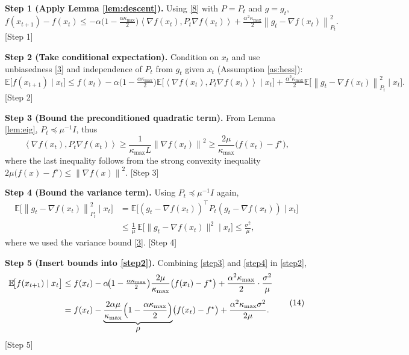 \documentclass{article}
\newcommand{\E}{\mathbb{E}}
\newcommand{\norm}[1]{\left\lVert#1\right\rVert}
\newcommand{\ip}[2]{\left\langle #1,#2\right\rangle}
\newcommand{\grad}{\nabla}
\begin{document}
\noindent\textbf{Step 1 (Apply Lemma \ref{lem:descent}).}  
Using \eqref{8} with $P=P_t$ and $g=g_t$,
\[
f(x_{t+1})-f(x_t)\le -\alpha\!\bigl(1-\tfrac{\alpha\kappa_{\max}}{2}\bigr)
\ip{\grad f(x_t)}{P_t\grad f(x_t)}
+\tfrac{\alpha^2\kappa_{\max}}{2}\norm{g_t-\grad f(x_t)}_{P_t}^2 .
\tag{10}\label{step1}
\]
[Step 1]

\noindent\textbf{Step 2 (Take conditional expectation).}  
Condition on $x_t$ and use unbiasedness \eqref{3} and independence of $P_t$ from $g_t$ given $x_t$ (Assumption \ref{as:hess}):
\[
\E\!\big[f(x_{t+1})\mid x_t\big]\le
f(x_t)-\alpha\!\bigl(1-\tfrac{\alpha\kappa_{\max}}{2}\bigr)
\E\!\big[\ip{\grad f(x_t)}{P_t\grad f(x_t)}\mid x_t\big]
+\tfrac{\alpha^2\kappa_{\max}}{2}
\E\!\big[\norm{g_t-\grad f(x_t)}_{P_t}^2\mid x_t\big].
\tag{11}\label{step2}
\]
[Step 2]

\noindent\textbf{Step 3 (Bound the preconditioned quadratic term).}  
From Lemma \ref{lem:eig}, $P_t\preceq \mu^{-1}I$, thus
\[
\ip{\grad f(x_t)}{P_t\grad f(x_t)}
\ge \frac{1}{\kappa_{\max}L}\norm{\grad f(x_t)}^2
\ge \frac{2\mu}{\kappa_{\max}}\bigl(f(x_t)-f^\star\bigr),
\tag{12}\label{step3}
\]
where the last inequality follows from the strong convexity inequality $2\mu\bigl(f(x)-f^\star\bigr)\le\norm{\grad f(x)}^2$.
[Step 3]

\noindent\textbf{Step 4 (Bound the variance term).}  
Using $P_t\preceq \mu^{-1}I$ again,
\[
\begin{aligned}
\E\!\big[\norm{g_t-\grad f(x_t)}_{P_t}^2\mid x_t\big]
&=\E\!\big[(g_t-\grad f(x_t))^\top P_t (g_t-\grad f(x_t))\mid x_t\big] \\
&\le \frac{1}{\mu}\,\E\!\big[\|g_t-\grad f(x_t)\|^2\mid x_t\big]
\le \frac{\sigma^2}{\mu},
\end{aligned}
\tag{13}\label{step4}
\]
where we used the variance bound \eqref{3}.
[Step 4]

\noindent\textbf{Step 5 (Insert bounds into \eqref{step2}).}  
Combining \eqref{step3} and \eqref{step4} in \eqref{step2},
\[
\begin{aligned}
\E\!\big[f(x_{t+1})\mid x_t\big]
&\le f(x_t)-\alpha\!\bigl(1-\tfrac{\alpha\kappa_{\max}}{2}\bigr)
\frac{2\mu}{\kappa_{\max}}\bigl(f(x_t)-f^\star\bigr)
+\frac{\alpha^2\kappa_{\max}}{2}\cdot\frac{\sigma^2}{\mu}\\[4pt]
&= f(x_t)-\underbrace{\frac{2\alpha\mu}{\kappa_{\max}}\Bigl(1-\frac{\alpha\kappa_{\max}}{2}\Bigr)}_{\displaystyle\rho}
\bigl(f(x_t)-f^\star\bigr)+\frac{\alpha^2\kappa_{\max}\sigma^2}{2\mu}.
\end{aligned}
\tag{14}\label{step5}
\]
[Step 5]
\end{document}
